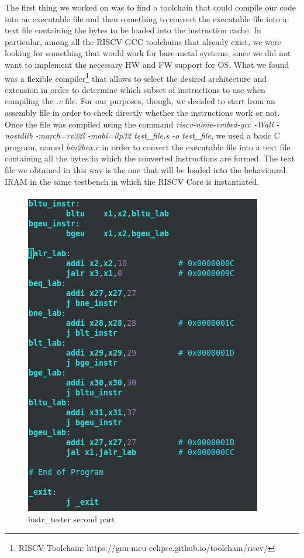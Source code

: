 \documentclass[10pt,  english, makeidx, a4paper, titlepage, oneside]{book}
\begin{document}
The first thing we worked on was to find a toolchain that could compile our code into an executable file and then something to convert the executable file into a text file containing the bytes to be loaded into the instruction cache.\newline
In particular, among all the RISCV GCC toolchains that already exist, we were looking for something that would work for bare-metal systems, since we did not want to implement the necessary HW and FW support for OS. What we found was a flexible compiler\footnote{RISCV Toolchain: https://gnu-mcu-eclipse.github.io/toolchain/riscv/} that allows to select the desired architecture and extension in order to determine which subset of instructions to use when compiling the \textit{.c} file. \newline
For our purposes, though, we decided to start from an assembly file in order to check directly whether the instructions work or not. Once the file was compiled using the command \textit{riscv-none-embed-gcc -Wall -nostdlib -march=rv32i -mabi=ilp32 test\_file.s -o test\_file}, we used a basic C program, named \textit{bin2hex.c} in order to convert the executable file into a text file containing all the bytes in which the converted instructions are formed. The text file we obtained in this way is the one that will be loaded into the behavioural IRAM in the same testbench in which the RISCV Core is instantiated.\newline

\begin{figure}
\paragraph{}
\vspace*{-\parskip}	\centering
    \includegraphics[width=.28\textwidth]{pics/instr_tester2.png}
    \caption{instr\_tester second part}
    \label{fig:instr_tester_2}
\end{figure}
\end{document}
